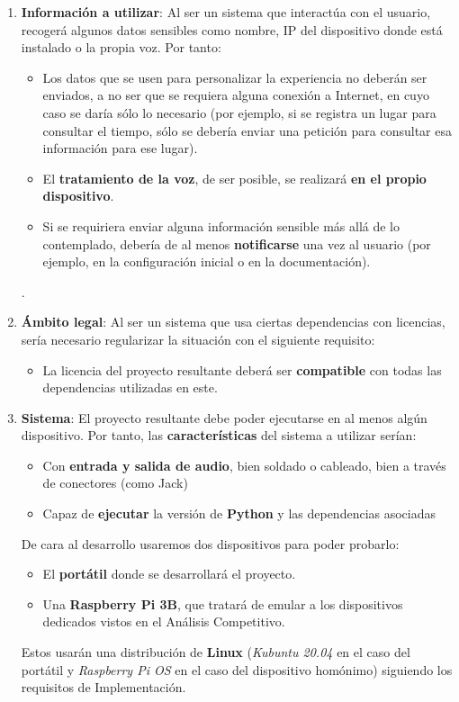\begin{enumerate}
	\item \textbf{Información a utilizar}: Al ser un sistema que interactúa con el usuario, recogerá algunos datos sensibles como nombre, IP del dispositivo donde está instalado o la propia voz. Por tanto:
	\begin{itemize}
		\item Los datos que se usen para personalizar la experiencia no deberán ser enviados, a no ser que se requiera alguna conexión a Internet, en cuyo caso se daría sólo lo necesario (por ejemplo, si se registra un lugar para consultar el tiempo, sólo se debería enviar una petición para consultar esa información para ese lugar).
		\item El \textbf{tratamiento de la voz}, de ser posible, se realizará \textbf{en el propio dispositivo}.
		\item Si se requiriera enviar alguna información sensible más allá de lo contemplado, debería de al menos \textbf{notificarse} una vez al usuario (por ejemplo, en la configuración inicial o en la documentación).
	\end{itemize}
.
	\item \textbf{Ámbito legal}: Al ser un sistema que usa ciertas dependencias con licencias, sería necesario regularizar la situación con el siguiente requisito:
	\begin{itemize}
		\item La licencia del proyecto resultante deberá ser \textbf{compatible} con todas las dependencias utilizadas en este.
	\end{itemize}

	\item \textbf{Sistema}: El proyecto resultante debe poder ejecutarse en al menos algún dispositivo. Por tanto, las \textbf{características} del sistema a utilizar serían:
	\begin{itemize}
		\item Con \textbf{entrada y salida de audio}, bien soldado o cableado, bien a través de conectores (como Jack)
		\item Capaz de \textbf{ejecutar} la versión de \textbf{Python} y las dependencias asociadas
	\end{itemize}

	De cara al desarrollo usaremos dos dispositivos para poder probarlo:
	\begin{itemize}
		\item El \textbf{portátil} donde se desarrollará el proyecto.
		\item Una \textbf{Raspberry Pi 3B}, que tratará de emular a los dispositivos dedicados vistos en el Análisis Competitivo.
	\end{itemize}
	Estos usarán una distribución de \textbf{Linux} (\textit{Kubuntu 20.04} en el caso del portátil y \textit{Raspberry Pi OS} en el caso del dispositivo homónimo) siguiendo los requisitos de Implementación.
\end{enumerate}
 